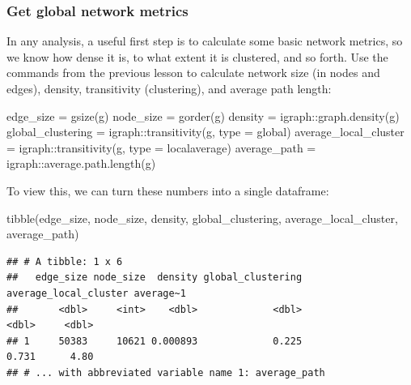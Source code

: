 \documentclass[
]{book}
\newenvironment{Shaded}{\begin{snugshade}}{\end{snugshade}}
\newcommand{\AttributeTok}[1]{\textcolor[rgb]{0.77,0.63,0.00}{#1}}
\newcommand{\FunctionTok}[1]{\textcolor[rgb]{0.00,0.00,0.00}{#1}}
\newcommand{\NormalTok}[1]{#1}
\newcommand{\OtherTok}[1]{\textcolor[rgb]{0.56,0.35,0.01}{#1}}
\newcommand{\SpecialCharTok}[1]{\textcolor[rgb]{0.00,0.00,0.00}{#1}}
\newcommand{\StringTok}[1]{\textcolor[rgb]{0.31,0.60,0.02}{#1}}
\begin{document}
\hypertarget{get-global-network-metrics}{%
\subsubsection{Get global network metrics}\label{get-global-network-metrics}}

In any analysis, a useful first step is to calculate some basic network metrics, so we know how dense it is, to what extent it is clustered, and so forth. Use the commands from the previous lesson to calculate network size (in nodes and edges), density, transitivity (clustering), and average path length:

\begin{Shaded}
\begin{Highlighting}[]
\NormalTok{edge\_size }\OtherTok{=} \FunctionTok{gsize}\NormalTok{(g)}
\NormalTok{node\_size }\OtherTok{=} \FunctionTok{gorder}\NormalTok{(g)}
\NormalTok{density }\OtherTok{=}\NormalTok{ igraph}\SpecialCharTok{::}\FunctionTok{graph.density}\NormalTok{(g)}
\NormalTok{global\_clustering }\OtherTok{=}\NormalTok{ igraph}\SpecialCharTok{::}\FunctionTok{transitivity}\NormalTok{(g, }\AttributeTok{type =} \StringTok{\textquotesingle{}global\textquotesingle{}}\NormalTok{)}
\NormalTok{average\_local\_cluster }\OtherTok{=}\NormalTok{ igraph}\SpecialCharTok{::}\FunctionTok{transitivity}\NormalTok{(g, }\AttributeTok{type =} \StringTok{\textquotesingle{}localaverage\textquotesingle{}}\NormalTok{)}
\NormalTok{average\_path }\OtherTok{=}\NormalTok{ igraph}\SpecialCharTok{::}\FunctionTok{average.path.length}\NormalTok{(g)}
\end{Highlighting}
\end{Shaded}

To view this, we can turn these numbers into a single dataframe:

\begin{Shaded}
\begin{Highlighting}[]
\FunctionTok{tibble}\NormalTok{(edge\_size, node\_size, density, global\_clustering, average\_local\_cluster, average\_path) }
\end{Highlighting}
\end{Shaded}

\begin{verbatim}
## # A tibble: 1 x 6
##   edge_size node_size  density global_clustering average_local_cluster average~1
##       <dbl>     <int>    <dbl>             <dbl>                 <dbl>     <dbl>
## 1     50383     10621 0.000893             0.225                 0.731      4.80
## # ... with abbreviated variable name 1: average_path
\end{verbatim}
\end{document}
